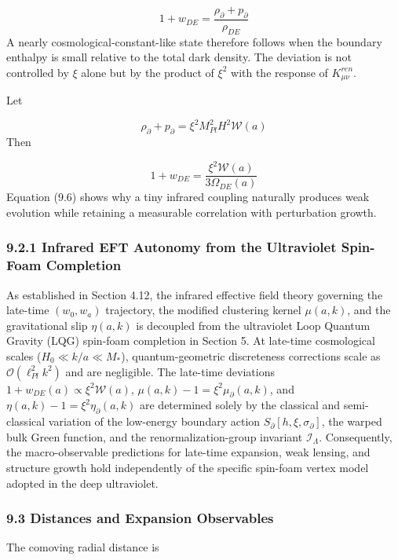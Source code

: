 \documentclass[aps,prd,onecolumn,superscriptaddress,nofootinbib,longbibliography,10pt]{revtex4-2}
\begin{document}
  \[ 1 + w_{DE} = \frac{\rho_\partial + p_\partial}{\rho_{DE}} \]
  A nearly cosmological-constant-like state therefore follows when the boundary enthalpy is small relative to the total dark density. The deviation is not controlled by \(\xi\) alone but by the product of \(\xi^2\) with the response of \(K^{ren}_{\mu\nu}\).


  Let


  \[ \rho_\partial + p_\partial = \xi^2 M_{Pl}^2 H^2 \mathcal{W}(a) \]
  Then


  \[ 1 + w_{DE} = \frac{\xi^2 \mathcal{W}(a)}{3\Omega_{DE}(a)} \]
  Equation (9.6) shows why a tiny infrared coupling naturally produces weak evolution while retaining a measurable correlation with perturbation growth.



  
\subsubsection*{9.2.1 Infrared EFT Autonomy from the Ultraviolet Spin-Foam Completion}

  As established in Section 4.12, the infrared effective field theory governing the late-time \((w_0, w_a)\) trajectory, the modified clustering kernel \(\mu(a,k)\), and the gravitational slip \(\eta(a,k)\) is decoupled from the ultraviolet Loop Quantum Gravity (LQG) spin-foam completion in Section 5. At late-time cosmological scales (\(H_0 \ll k/a \ll M_*\)), quantum-geometric discreteness corrections scale as \(\mathcal{O}(\ell_{Pl}^2 k^2)\) and are negligible. The late-time deviations \(1 + w_{DE}(a) \propto \xi^2 \mathcal{W}(a)\), \(\mu(a,k) - 1 = \xi^2 \mu_\partial(a,k)\), and \(\eta(a,k) - 1 = \xi^2 \eta_\partial(a,k)\) are determined solely by the classical and semi-classical variation of the low-energy boundary action \(S_\partial[h,\xi,\sigma_\partial]\), the warped bulk Green function, and the renormalization-group invariant \(\mathcal{I}_\Lambda\). Consequently, the macro-observable predictions for late-time expansion, weak lensing, and structure growth hold independently of the specific spin-foam vertex model adopted in the deep ultraviolet.



  
\subsubsection*{9.3 Distances and Expansion Observables}

  The comoving radial distance is
\end{document}
